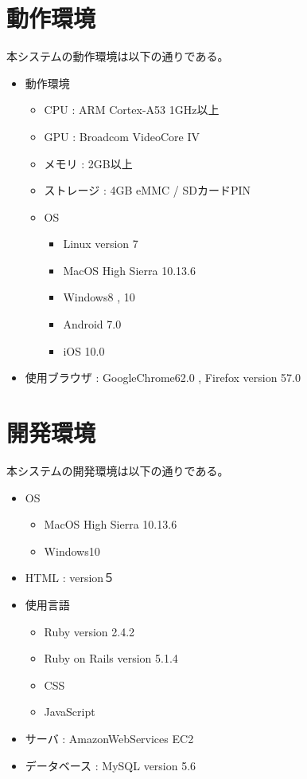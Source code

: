 \documentclass[a4j]{jarticle}
\begin{document}
 \section{動作環境}
本システムの動作環境は以下の通りである。
\begin{itemize}
\item 動作環境
	\begin{itemize}
	\item CPU : ARM Cortex-A53 1GHz以上
	\item GPU : Broadcom VideoCore IV
	\item メモリ : 2GB以上
	\item ストレージ : 4GB eMMC / SDカードPIN
	\item OS
	\begin{itemize}
		\item Linux version 7
		\item MacOS High Sierra 10.13.6
		\item Windows8 , 10
    \item Android 7.0
		\item iOS 10.0
	\end{itemize}
	\end{itemize}
\item 使用ブラウザ : GoogleChrome62.0 , Firefox version 57.0%
\end{itemize}
\section{開発環境}
本システムの開発環境は以下の通りである。
\begin{itemize}
\item OS
	\begin{itemize}
		\item MacOS High Sierra 10.13.6
		\item Windows10
	\end{itemize}
\item HTML : version５
\item 使用言語
	\begin{itemize}
	\item Ruby version 2.4.2
	\item Ruby on Rails version 5.1.4
	\item CSS
	\item JavaScript
	\end{itemize}
\item サーバ : AmazonWebServices EC2
\item データベース : MySQL version 5.6
\end{itemize}
\end{document}
